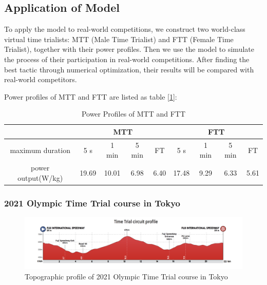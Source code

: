 \subsection{Application of Model}

\par To apply the model to real-world competitions, we construct two world-class virtual time trialists: MTT (Male Time Trialist) and FTT (Female Time Trialist), together with their power profiles. Then we use the model to simulate the process of their participation in real-world competitions. After finding the best tactic through numerical optimization, their results will be compared with real-world competitors.

\par Power profiles of MTT and FTT are listed as table [\ref{tab:pp}]:
\begin{table}[htbp]
	\setlength{\belowcaptionskip}{0.2cm}
	\centering
	\caption{ Power Profiles of MTT and FTT}
	\begin{tabular}{c|cccc|cccc}
		\toprule[2pt]
		& \multicolumn{4}{c|}{MTT}      & \multicolumn{4}{c}{FTT} \\
		\midrule
		maximum duration & 5 s   & 1 min & 5 min & FT    & 5 s   & 1 min & 5 min & FT \\
		power output(W/kg) & 19.69 & 10.01 & 6.98  & 6.40  & 17.48 & 9.29  & 6.33  & 5.61 \\
		\bottomrule[2pt]
	\end{tabular}%
	\label{tab:pp}%
\end{table}%

\subsubsection{2021 Olympic Time Trial course in Tokyo}
\begin{figure}[h]
	\centering
	\includegraphics[width=0.8\linewidth]{"image/东京+uci/东京 女 time trial circuit"}
	\caption{Topographic profile of 2021 Olympic Time Trial course in Tokyo}
	\label{trackt}
\end{figure}
